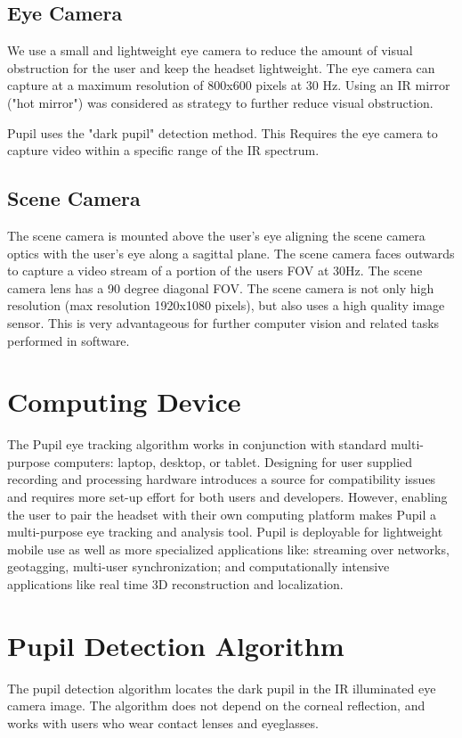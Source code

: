 \documentclass[12pt,fleqn]{book} %
\begin{document}
\subsection{Eye Camera} 
We use a small and lightweight eye camera to reduce the amount of visual obstruction for the user and keep the headset lightweight. The eye camera can capture at a maximum resolution of 800x600 pixels at 30 Hz. Using an IR mirror ("hot mirror") was considered as  strategy to further reduce visual obstruction. 

\bigskip
 Pupil uses the "dark pupil" detection method. This Requires the eye camera to capture video within a specific range of the IR spectrum. 
 
\subsection{Scene Camera} 
The scene camera is mounted above the user’s eye aligning the scene camera optics with the user’s eye along a sagittal plane. The scene camera faces outwards to capture a video stream of a portion of the users FOV at 30Hz. The scene camera lens has a 90 degree diagonal FOV. The scene camera is not only high resolution (max resolution 1920x1080 pixels), but also uses a high quality image sensor. This is very 
advantageous for further computer vision and related tasks
performed in software.


\section{Computing Device} 
The Pupil eye tracking algorithm works in conjunction with standard multi-purpose computers: laptop, desktop, or tablet. Designing for user supplied recording and processing hardware introduces a source for compatibility issues and requires more set-up effort for both users and developers. However, enabling the user to pair the headset with their own computing platform makes Pupil a multi-purpose eye tracking and analysis tool. Pupil is deployable for lightweight mobile use as well as more specialized applications like: streaming over networks, geotagging, multi-user synchronization; and computationally intensive applications like real time 3D reconstruction and localization.

\section{Pupil Detection Algorithm} 
The pupil detection algorithm locates the dark pupil in the IR illuminated eye camera image. The algorithm does not depend on the corneal reflection, and works with users who wear contact lenses and eyeglasses. \bigskip
\end{document}
